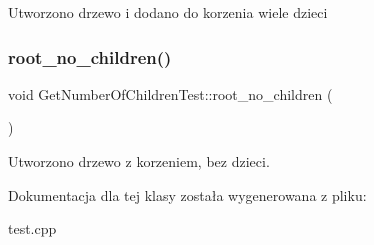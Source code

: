 Utworzono drzewo i dodano do korzenia wiele dzieci \mbox{\label{class_get_number_of_children_test_ab43b852fd1b487614fbb1799b54f723a}} 
\subsubsection{\texorpdfstring{root\+\_\+no\+\_\+children()}{root\_no\_children()}}
{\footnotesize\ttfamily void Get\+Number\+Of\+Children\+Test\+::root\+\_\+no\+\_\+children (\begin{DoxyParamCaption}{ }\end{DoxyParamCaption})\hspace{0.3cm}{\ttfamily [inline]}}

Utworzono drzewo z korzeniem, bez dzieci. 

Dokumentacja dla tej klasy została wygenerowana z pliku\+:\begin{DoxyCompactItemize}
\item 
test.\+cpp\end{DoxyCompactItemize}

